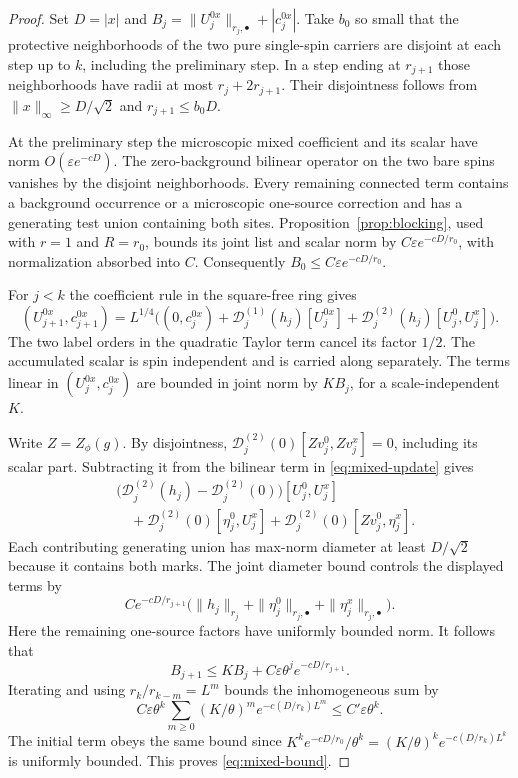 \documentclass[11pt]{article}
\theoremstyle{definition}
\begin{document}
\begin{proof}
Set \(D=|x|\) and \(B_j=\|U_j^{0x}\|_{r_j,\bullet}+|c_j^{0x}|\).
Take \(b_0\) so small that the protective neighborhoods of the two
pure single-spin carriers are disjoint at each step up to \(k\),
including the preliminary step. In a step ending at \(r_{j+1}\)
those neighborhoods have radii at most \(r_j+2r_{j+1}\).
Their disjointness follows from
\(\|x\|_\infty\ge D/\sqrt2\) and \(r_{j+1}\le b_0D\).

At the preliminary step the microscopic mixed coefficient and
its scalar have norm \(O(\varepsilon e^{-cD})\).
The zero-background bilinear operator on the two bare spins
vanishes by the disjoint neighborhoods. Every remaining
connected term contains a background occurrence or a microscopic
one-source correction and has a generating test union containing
both sites. Proposition~\ref{prop:blocking}, used with
\(r=1\) and \(R=r_0\), bounds its joint list and scalar norm
by \(C\varepsilon e^{-cD/r_0}\), with normalization absorbed
into \(C\). Consequently \(B_0\le C\varepsilon e^{-cD/r_0}\).

For \(j<k\) the coefficient rule in the square-free ring gives
\begin{equation}
 (U_{j+1}^{0x},c_{j+1}^{0x})=
 L^{1/4}\Big((0,c_j^{0x})
      +\mathcal D_j^{(1)}(h_j)[U_j^{0x}]
      +\mathcal D_j^{(2)}(h_j)[U_j^0,U_j^x]\Big).
 \label{eq:mixed-update}
\end{equation}
The two label orders in the quadratic Taylor term cancel its
factor \(1/2\).
The accumulated scalar is spin independent and is carried along
separately. The terms linear in \((U_j^{0x},c_j^{0x})\) are
bounded in joint norm by \(K B_j\), for a scale-independent \(K\).

Write \(Z=Z_\phi(g)\). By disjointness,
\(\mathcal D_j^{(2)}(0)[Zv_j^0,Zv_j^x]=0\), including its
scalar part. Subtracting it from the bilinear term in
\eqref{eq:mixed-update} gives
\begin{align*}
 &\big(\mathcal D_j^{(2)}(h_j)-\mathcal D_j^{(2)}(0)\big)
       [U_j^0,U_j^x] \\
 &\quad + \mathcal D_j^{(2)}(0)[\eta_j^0,U_j^x]
         + \mathcal D_j^{(2)}(0)[Zv_j^0,\eta_j^x].
\end{align*}
Each contributing generating union has max-norm diameter at
least \(D/\sqrt2\) because it contains both marks. The joint diameter bound controls the displayed
terms by
\[
 C e^{-cD/r_{j+1}}\bigl(\|h_j\|_{r_j}
               +\|\eta_j^0\|_{r_j,\bullet}
               +\|\eta_j^x\|_{r_j,\bullet}\bigr).
\]
Here the remaining one-source factors have uniformly bounded
norm. It follows that
\[
 B_{j+1}\le K B_j+
 C\varepsilon\theta^j e^{-cD/r_{j+1}}.
\]
Iterating and using \(r_k/r_{k-m}=L^m\) bounds the
inhomogeneous sum by
\[
 C\varepsilon\theta^k\sum_{m\ge0}
    (K/\theta)^m e^{-c(D/r_k)L^m}\le C'\varepsilon\theta^k.
\]
The initial term obeys the same bound since
\(K^k e^{-cD/r_0}/\theta^k=(K/\theta)^k
e^{-c(D/r_k)L^k}\) is uniformly bounded.
This proves \eqref{eq:mixed-bound}.
\end{proof}
\end{document}
